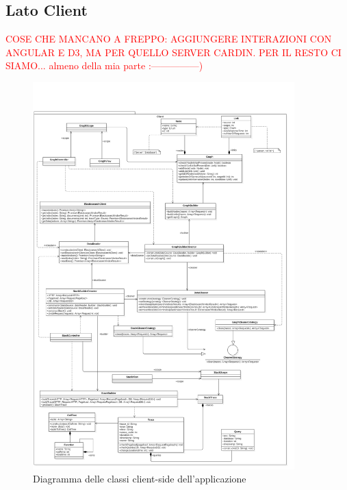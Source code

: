 
\subsection{Lato Client}

\textcolor{red}{COSE CHE MANCANO A FREPPO: AGGIUNGERE INTERAZIONI CON ANGULAR E D3, MA PER QUELLO SERVER CARDIN. PER IL RESTO CI SIAMO... almeno della mia parte :---------------)}

\begin{figure}[H]
    \centering
    \includegraphics[width=0.9\textwidth]{Images/classi.png}
    \caption{Diagramma delle classi client-side dell'applicazione}
    \label{img:diagrammaClassiClient}
\end{figure}

